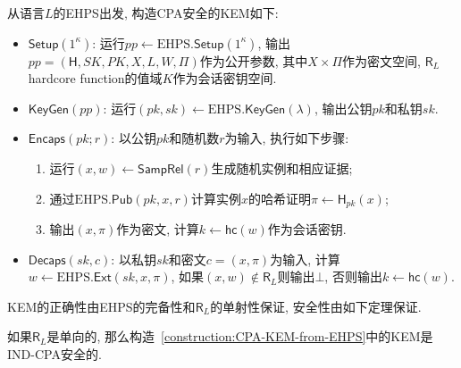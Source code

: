 \begin{construction}[基于EHPS的CPA安全KEM]\label{construction:CPA-KEM-from-EHPS}
从语言$L$的EHPS出发, 构造CPA安全的KEM如下:
\begin{itemize}
\item $\mathsf{Setup}(1^\kappa)$: 运行$pp \leftarrow \text{EHPS}.\mathsf{Setup}(1^\kappa)$, 
	输出$pp = (\mathsf{H}, SK, PK, X, L, W, \Pi)$作为公开参数, 
	其中$X \times \Pi$作为密文空间, $\mathsf{R}_L$hardcore function的值域$K$作为会话密钥空间.   

\item $\mathsf{KeyGen}(pp)$: 运行$(pk, sk) \leftarrow \text{EHPS}.\mathsf{KeyGen}(\lambda)$, 输出公钥$pk$和私钥$sk$. 

\item $\mathsf{Encaps}(pk;r)$: 以公钥$pk$和随机数$r$为输入, 执行如下步骤: 
\begin{enumerate}
	\item 运行$(x, w) \leftarrow \mathsf{SampRel}(r)$生成随机实例和相应证据;
     
    \item 通过$\text{EHPS}.\mathsf{Pub}(pk, x, r)$计算实例$x$的哈希证明$\pi \leftarrow \mathsf{H}_{pk}(x)$;  
    
    \item 输出$(x, \pi)$作为密文, 计算$k \leftarrow \mathsf{hc}(w)$作为会话密钥. 
\end{enumerate}

\item $\mathsf{Decaps}(sk, c)$: 以私钥$sk$和密文$c = (x, \pi)$为输入, 
	计算$w \leftarrow \text{EHPS}.\mathsf{Ext}(sk, x, \pi)$, 
    如果$(x, w) \notin \mathsf{R}_L$则输出$\bot$, 否则输出$k \leftarrow \mathsf{hc}(w)$. 
\end{itemize}
\end{construction} 

KEM的正确性由EHPS的完备性和$\mathsf{R}_L$的单射性保证, 安全性由如下定理保证. 

\begin{theorem}
如果$\mathsf{R}_L$是单向的, 那么构造~\ref{construction:CPA-KEM-from-EHPS}中的KEM是IND-CPA安全的. 
\end{theorem}

